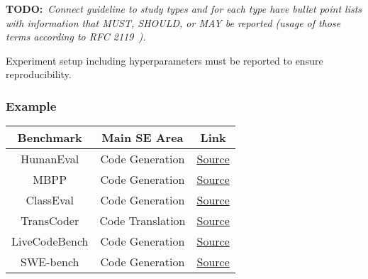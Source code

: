 \documentclass[11pt]{article}
\newcommand{\todo}[1]{{\textbf{TODO:}\ \textit{#1}}} %
\begin{document}

\todo{Connect guideline to study types and for each type have bullet point lists with information that MUST, SHOULD, or MAY be reported (usage of those terms according to RFC 2119~\cite{rfc2119}).}

Experiment setup including hyperparameters must be reported to ensure reproducibility.


\subsubsection{Example}

\begin{center}
\begin{tabular}{||c c c||}
\hline
Benchmark & Main SE Area & Link\\ %
\hline
\hline

HumanEval \cite{DBLP:conf/acl/PapineniRWZ02} & Code Generation & \href{https://github.com/openai/human-eval}{Source}\\
\hline

MBPP \cite{DBLP:journals/corr/abs-2108-07732} & Code Generation & \href{https://huggingface.co/datasets/google-research-datasets/mbpp}{Source}\\
\hline

ClassEval \cite{DBLP:journals/corr/abs-2308-01861} & Code Generation & \href{https://github.com/openai/human-eval}{Source}\\
\hline

TransCoder \cite{DBLP:journals/corr/abs-2006-03511} & Code Translation & \href{https://github.com/facebookresearch/CodeGen}{Source}\\
\hline

LiveCodeBench \cite{DBLP:journals/corr/abs-2403-0797} & Code Generation & \href{https://github.com/LiveCodeBench/LiveCodeBench}{Source}\\
\hline

SWE-bench \cite{DBLP:conf/iclr/JimenezYWYPPN2} & Code Generation & \href{https://github.com/swe-bench/SWE-bench}{Source}\\
\hline


\end{tabular}
\end{center}
\end{document}
